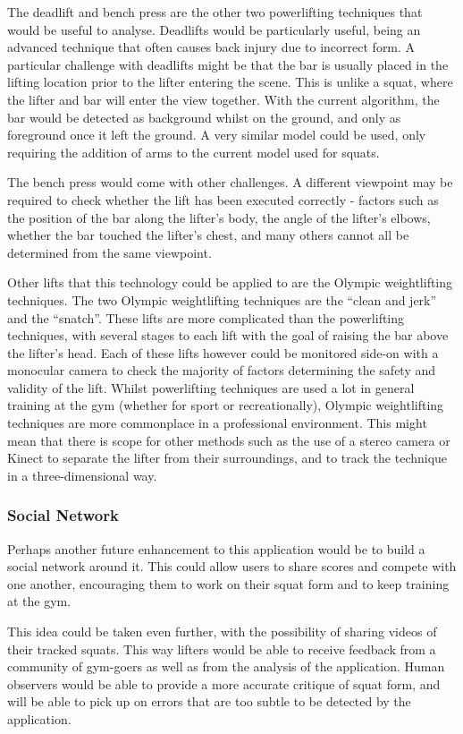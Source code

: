 The deadlift and bench press are the other two powerlifting techniques that would be useful to analyse. Deadlifts would be particularly useful, being an advanced technique that often causes back injury due to incorrect form. A particular challenge with deadlifts might be that the bar is usually placed in the lifting location prior to the lifter entering the scene. This is unlike a squat, where the lifter and bar will enter the view together. With the current algorithm, the bar would be detected as background whilst on the ground, and only as foreground once it left the ground. A very similar model could be used, only requiring the addition of arms to the current model used for squats.

The bench press would come with other challenges. A different viewpoint may be required to check whether the lift has been executed correctly - factors such as the position of the bar along the lifter's body, the angle of the lifter's elbows, whether the bar touched the lifter's chest, and many others cannot all be determined from the same viewpoint.

Other lifts that this technology could be applied to are the Olympic weightlifting techniques. The two Olympic weightlifting techniques are the ``clean and jerk'' and the ``snatch''. These lifts are more complicated than the powerlifting techniques, with several stages to each lift with the goal of raising the bar above the lifter's head. Each of these lifts however could be monitored side-on with a monocular camera to check the majority of factors determining the safety and validity of the lift. Whilst powerlifting techniques are used a lot in general training at the gym (whether for sport or recreationally), Olympic weightlifting techniques are more commonplace in a professional environment. This might mean that there is scope for other methods such as the use of a stereo camera or Kinect to separate the lifter from their surroundings, and to track the technique in a three-dimensional way. 

\subsubsection{Social Network}

Perhaps another future enhancement to this application would be to build a social network around it. This could allow users to share scores and compete with one another, encouraging them to work on their squat form and to keep training at the gym.

This idea could be taken even further, with the possibility of sharing videos of their tracked squats. This way lifters would be able to receive feedback from a community of gym-goers as well as from the analysis of the application. Human observers would be able to provide a more accurate critique of squat form, and will be able to pick up on errors that are too subtle to be detected by the application.

